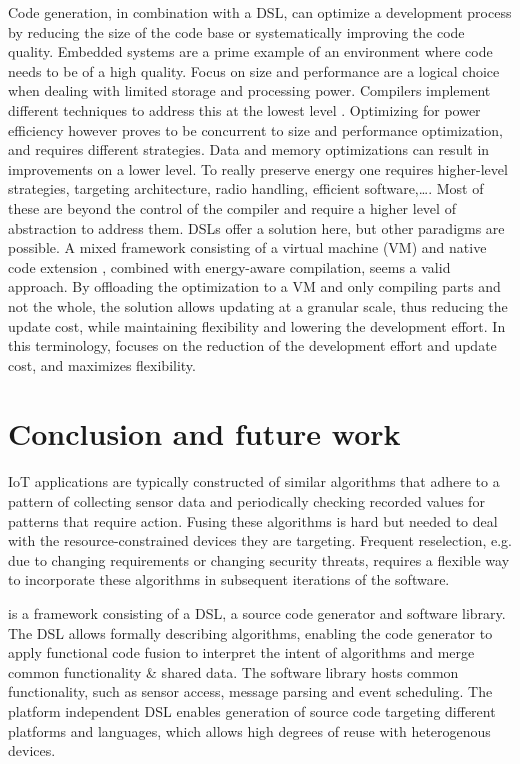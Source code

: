 \documentclass[3p,times,procedia]{elsarticle}
\begin{document}
Code generation, in combination with a DSL, can optimize a development process
by reducing the size of the code base or systematically improving the code
quality. Embedded systems are a prime example of an environment where code
needs to be of a high quality. Focus on size and performance are a logical
choice when dealing with limited storage and processing power. Compilers
implement different techniques to address this at the lowest level
\cite{marwedel2002code}. Optimizing for power efficiency however proves to be
concurrent to size and performance optimization, and requires different
strategies. Data and memory optimizations \cite{panda2001data} can result in
improvements on a lower level. To really preserve energy one requires
higher-level strategies, targeting architecture, radio handling, efficient
software,\dots \cite{naik2001software}. Most of these are beyond the control of
the compiler and require a higher level of abstraction to address them. DSLs
offer a solution here, but other paradigms are possible. A mixed framework
consisting of a virtual machine (VM) and native code extension
\cite{sadilek2007energy}, combined with energy-aware compilation, seems a valid
approach. By offloading the optimization to a VM and only compiling parts and
not the whole, the solution allows updating at a granular scale, thus reducing
the update cost, while maintaining flexibility and lowering the development
effort. In this terminology, \FOO focuses on the reduction of the development
effort and update cost, and maximizes flexibility.

\section{Conclusion and future work}
\label{conclusion}

IoT applications are typically constructed of similar algorithms that adhere to
a pattern of collecting sensor data and periodically checking recorded values
for patterns that require action. Fusing these algorithms is hard but needed to
deal with the resource-constrained devices they are targeting. Frequent
reselection, e.g. due to changing requirements or changing security threats,
requires a flexible way to incorporate these algorithms in subsequent
iterations of the software.

\FOO is a framework consisting of a DSL, a source code generator and software
library. The DSL allows formally describing algorithms, enabling the code
generator to apply functional code fusion to interpret the intent of algorithms
and merge common functionality \& shared data. The software library hosts
common functionality, such as sensor access, message parsing and event
scheduling. The platform independent DSL enables generation of source code
targeting different platforms and languages, which allows high degrees of reuse
with heterogenous devices.
\end{document}
